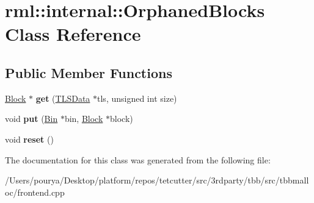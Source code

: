 \hypertarget{classrml_1_1internal_1_1OrphanedBlocks}{}\section{rml\+:\+:internal\+:\+:Orphaned\+Blocks Class Reference}
\label{classrml_1_1internal_1_1OrphanedBlocks}
\subsection*{Public Member Functions}
\begin{DoxyCompactItemize}
\item 
\hypertarget{classrml_1_1internal_1_1OrphanedBlocks_a3ed9f9cf98cd6c788195e57408c5ed26}{}\hyperlink{classrml_1_1internal_1_1Block}{Block} $\ast$ {\bfseries get} (\hyperlink{classrml_1_1internal_1_1TLSData}{T\+L\+S\+Data} $\ast$tls, unsigned int size)\label{classrml_1_1internal_1_1OrphanedBlocks_a3ed9f9cf98cd6c788195e57408c5ed26}

\item 
\hypertarget{classrml_1_1internal_1_1OrphanedBlocks_a4243878c1241abb1b33588743d094ab4}{}void {\bfseries put} (\hyperlink{classrml_1_1internal_1_1Bin}{Bin} $\ast$bin, \hyperlink{classrml_1_1internal_1_1Block}{Block} $\ast$block)\label{classrml_1_1internal_1_1OrphanedBlocks_a4243878c1241abb1b33588743d094ab4}

\item 
\hypertarget{classrml_1_1internal_1_1OrphanedBlocks_ab0e3bca882f21bd89f6f76bcd33d4640}{}void {\bfseries reset} ()\label{classrml_1_1internal_1_1OrphanedBlocks_ab0e3bca882f21bd89f6f76bcd33d4640}

\end{DoxyCompactItemize}


The documentation for this class was generated from the following file\+:\begin{DoxyCompactItemize}
\item 
/\+Users/pourya/\+Desktop/platform/repos/tetcutter/src/3rdparty/tbb/src/tbbmalloc/frontend.\+cpp\end{DoxyCompactItemize}
